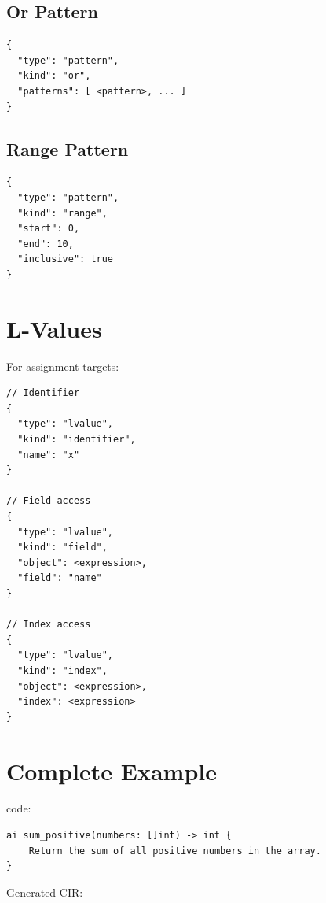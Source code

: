 \subsection{Or Pattern}

\begin{lstlisting}[language={}]
{
  "type": "pattern",
  "kind": "or",
  "patterns": [ <pattern>, ... ]
}
\end{lstlisting}

\subsection{Range Pattern}

\begin{lstlisting}[language={}]
{
  "type": "pattern",
  "kind": "range",
  "start": 0,
  "end": 10,
  "inclusive": true
}
\end{lstlisting}

\section{L-Values}

For assignment targets:

\begin{lstlisting}[language={}]
// Identifier
{
  "type": "lvalue",
  "kind": "identifier",
  "name": "x"
}

// Field access
{
  "type": "lvalue",
  "kind": "field",
  "object": <expression>,
  "field": "name"
}

// Index access
{
  "type": "lvalue",
  "kind": "index",
  "object": <expression>,
  "index": <expression>
}
\end{lstlisting}

\section{Complete Example}

\haira{} code:

\begin{lstlisting}
ai sum_positive(numbers: []int) -> int {
    Return the sum of all positive numbers in the array.
}
\end{lstlisting}

Generated CIR:

